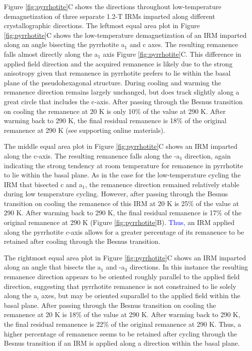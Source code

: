 \documentclass[draft,gc]{AGUTeX}
\begin{document}
\begin{article}
Figure \ref{fig:pyrrhotite}C shows the directions throughout low-temperature demagnetization of three separate 1.2-T IRMs imparted along different crystallographic directions. The leftmost equal area plot in Figure \ref{fig:pyrrhotite}C shows the low-temperature demagnetization of an IRM imparted along an angle bisecting the pyrrhotite a$_{1}$ and c axes. The resulting remanence falls almost directly along the a$_{1}$ axis Figure \ref{fig:pyrrhotite}C. This difference in applied field direction and the acquired remanence is likely due to the strong anisotropy given that remanence in pyrrhotite prefers to lie within the basal plane of the pseudohexagonal structure. During cooling and warming the remanence direction remains largely unchanged, but does track slightly along a great circle that includes the c-axis. After passing through the Besnus transition on cooling the remanence at 20 K is only 10\% of the value at 290 K. After warming back to 290 K, the final residual remanence is 18\% of the original remanence at 290 K (see supporting online materials). 

The middle equal area plot in Figure \ref{fig:pyrrhotite}C shows an IRM imparted along the c-axis. The resulting remanence falls along the -a$_{1}$ direction, again indicating the strong tendency at room temperature for remanence in pyrrhotite to lie within the basal plane. As in the case for the low-temperature cycling the IRM that bisected c and a$_{1}$, the remanence direction remained relatively stable during low temperature cycling. However, after passing through the Besnus transition on cooling the remanence of this IRM at 20 K is 25\% of the value at 290 K. After warming back to 290 K, the final residual remanence is 17\% of the original remanence at 290 K (Figure \ref{fig:pyrrhotite}B). \textcolor{blue}{Thus,} an IRM applied along the pyrrhotite c-axis allows for a greater percentage of its remanence to be retained after cooling through the Besnus transition.    

The rightmost equal area plot in Figure \ref{fig:pyrrhotite}C shows an IRM imparted along an angle that bisects the a$_{1}$ and -a$_{3}$ directions. In this instance the resulting remanence direction appears to be oriented roughly parallel to the applied field direction, suggesting that pyrrhotite remanence is not constrained to lie solely along the a$_{i}$ axes, but may be oriented suparallel to the applied field within the basal plane. After passing through the Besnus transition on cooling the remanence at 20 K is 18\% of the value at 290 K. After warming back to 290 K, the final residual remanence is 22\% of the original remanence at 290 K. Thus, a higher percentage of remanence seems to be retained after cycling through the Besnus transition if an IRM is applied along a direction within the basal plane. 


\end{article}
\end{document}
